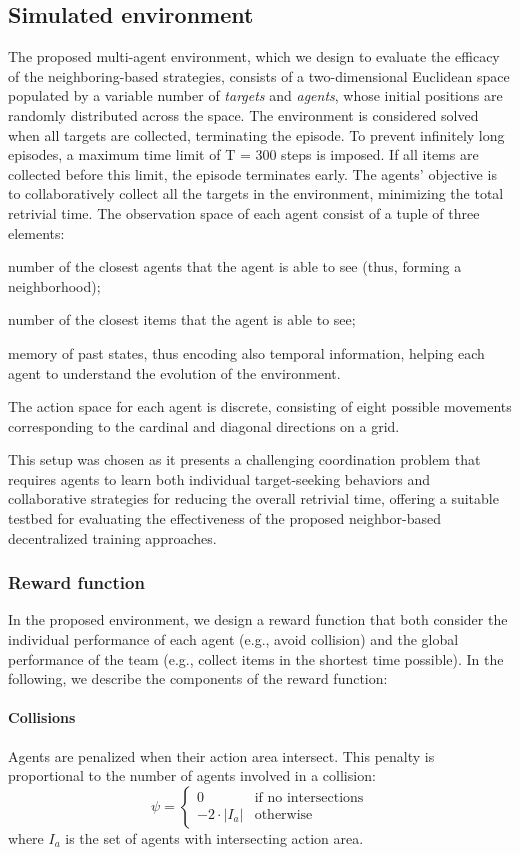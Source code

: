 \documentclass[sigconf]{acmart}
\begin{document}
\subsection{Simulated environment}
The proposed multi-agent environment, which we design to evaluate the efficacy of the neighboring-based strategies,
 consists of a two-dimensional Euclidean space 
 populated by a variable number of \emph{targets} and \emph{agents}, 
 whose initial positions are randomly distributed across the space.
%
The environment is considered solved when all targets are collected, terminating the episode. 
To prevent infinitely long episodes, a maximum time limit of T = 300 steps is imposed. 
If all items are collected before this limit, the episode terminates early.
The agents' objective  is to collaboratively collect all the targets in the environment, minimizing the total retrivial time.
%
The observation space of each agent consist of a tuple of three elements: %
\begin{enumerate*}[label=(\roman*)]
  \item number of the closest agents that the agent is able to see (thus, forming a neighborhood);
  \item number of the closest items that the agent is able to see;
  \item memory of past states, thus encoding also temporal information, helping each agent to understand 
    the evolution of the environment.
\end{enumerate*} 
%
The action space for each agent is discrete, 
consisting of eight possible movements corresponding 
to the cardinal and diagonal directions on a grid.
%

This setup was chosen as it presents a challenging coordination problem that requires agents to learn both individual target-seeking behaviors and collaborative strategies for reducing the overall retrivial time, 
offering a suitable testbed for evaluating the effectiveness of the proposed neighbor-based decentralized training approaches.
\subsubsection{Reward function}
In the proposed environment, we design a reward function that both consider the individual performance of each agent (e.g., avoid collision) and the global performance of the team (e.g., collect items in the shortest time possible).
In the following, we describe the components of the reward function:
\paragraph{Collisions} Agents are penalized when their action area intersect. This penalty is proportional to the number of agents involved in a collision:
  \[ \psi = \begin{cases}
    0 & \text{if no intersections} \\
    -2 \cdot |I_a| & \text{otherwise}
  \end{cases} \]
where $I_a$ is the set of agents with intersecting action area.
\end{document}

